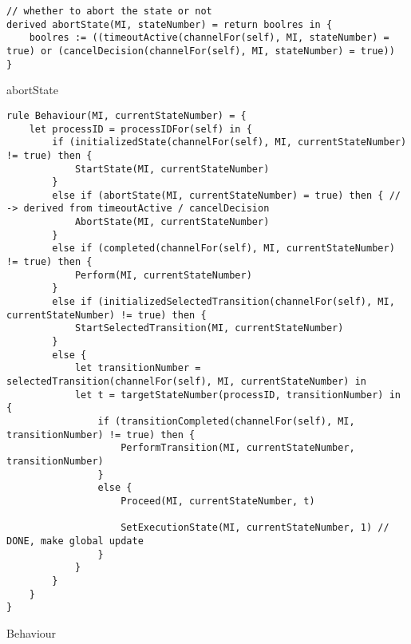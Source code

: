 \begin{listing}[H]
\begin{verbatim}
// whether to abort the state or not
derived abortState(MI, stateNumber) = return boolres in {
    boolres := ((timeoutActive(channelFor(self), MI, stateNumber) = true) or (cancelDecision(channelFor(self), MI, stateNumber) = true))
}
\end{verbatim}
\caption{abortState}
\label{lst:asm:abortState}
\end{listing}




\begin{listing}[H]
\begin{verbatim}
rule Behaviour(MI, currentStateNumber) = {
    let processID = processIDFor(self) in {
        if (initializedState(channelFor(self), MI, currentStateNumber) != true) then {
            StartState(MI, currentStateNumber)
        }
        else if (abortState(MI, currentStateNumber) = true) then { // -> derived from timeoutActive / cancelDecision
            AbortState(MI, currentStateNumber)
        }
        else if (completed(channelFor(self), MI, currentStateNumber) != true) then {
            Perform(MI, currentStateNumber)
        }
        else if (initializedSelectedTransition(channelFor(self), MI, currentStateNumber) != true) then {
            StartSelectedTransition(MI, currentStateNumber)
        }
        else {
            let transitionNumber = selectedTransition(channelFor(self), MI, currentStateNumber) in
            let t = targetStateNumber(processID, transitionNumber) in {
                if (transitionCompleted(channelFor(self), MI, transitionNumber) != true) then {
                    PerformTransition(MI, currentStateNumber, transitionNumber)
                }
                else {
                    Proceed(MI, currentStateNumber, t)

                    SetExecutionState(MI, currentStateNumber, 1) // DONE, make global update
                }
            }
        }
    }
}
\end{verbatim}
\caption{Behaviour}
\label{lst:asm:Behaviour}
\end{listing}




